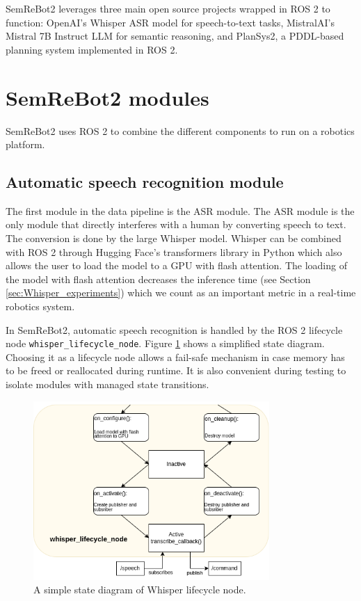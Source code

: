 SemReBot2 leverages three main open source projects wrapped in ROS 2 to function: OpenAI's Whisper ASR model for speech-to-text tasks, MistralAI's Mistral 7B Instruct LLM for semantic reasoning, and PlanSys2, a PDDL-based planning system implemented in ROS 2.

\section{SemReBot2 modules}
SemReBot2 uses ROS 2 to combine the different components to run on a robotics platform.

\subsection{Automatic speech recognition module}
The first module in the data pipeline is the ASR module. The ASR module is the only module that directly interferes with a human by converting speech to text. The conversion is done by the large Whisper model. Whisper can be combined with ROS 2 through Hugging Face's transformers library in Python which also allows the user to load the model to a GPU with flash attention. The loading of the model with flash attention decreases the inference time (see Section \ref{sec:Whisper_experiments}) which we count as an important metric in a real-time robotics system.

In SemReBot2, automatic speech recognition is handled by the ROS 2 lifecycle node \newline\verb|whisper_lifecycle_node|. Figure \ref{fig:whisper_lifecycle} shows a simplified state diagram. Choosing it as a lifecycle node allows a fail-safe mechanism in case memory has to be freed or reallocated during runtime. It is also convenient during testing to isolate modules with managed state transitions.

\begin{figure}[h]
    \centering
    \includegraphics[width=0.8\textwidth]{figures/whisper_lifecycle.png}
    \caption[Whisper lifecycle node]{A simple state diagram of Whisper lifecycle node.}
    \label{fig:whisper_lifecycle}
\end{figure}

